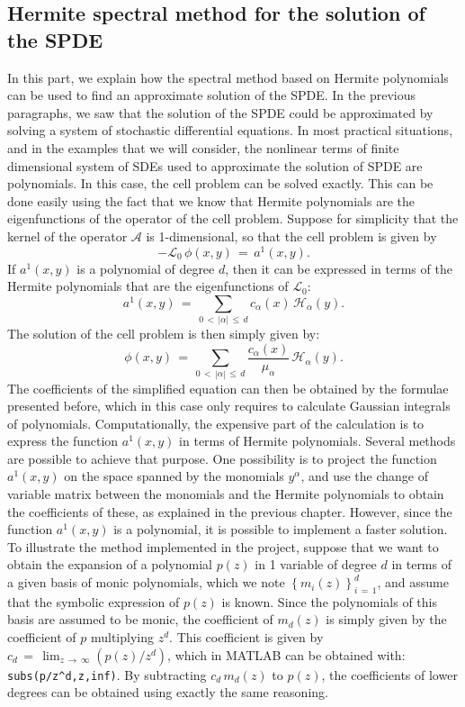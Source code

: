 \subsection{Hermite spectral method for the solution of the SPDE}
\label{sub:spectral_method_for_the_solution_of_the_spde}
In this part, we explain how the spectral method based on Hermite polynomials can be used to find an approximate solution of the SPDE. In the previous paragraphs, we saw that the solution of the SPDE could be approximated by solving a system of stochastic differential equations. In most practical situations, and in the examples that we will consider, the nonlinear terms of finite dimensional system of SDEs used to approximate the solution of SPDE are polynomials. In this case, the cell problem can be solved exactly. This can be done easily using the fact that we know that Hermite polynomials are the eigenfunctions of the operator of the cell problem. Suppose for simplicity that the kernel of the operator $\mathcal A$ is 1-dimensional, so that the cell problem is given by
\begin{equation*}
    -\mathcal L_0\,{\phi}(x,y) \,=\, a^1(x,y).
\end{equation*}
If $a^1(x,y)$ is a polynomial of degree $d$, then it can be expressed in terms of the Hermite polynomials that are the eigenfunctions of $\mathcal L_0$:  
\begin{equation*}
    a^1(x,y) \,=\, \sum_{0\,<\,|{\alpha}|\,{\leq}\,d} c_{\alpha} (x) \, \mathcal H_{\alpha}(y). 
\end{equation*}
The solution of the cell problem is then simply given by:
\begin{equation*}
    {\phi}(x,y) \,=\,\sum_{0 \,<\,|\mathcal {\alpha}| \,{\leq}\, d} \frac{c_{\alpha}(x)}{{\mu}_{\alpha}}\,   \mathcal H_{\alpha}(y). 
\end{equation*}
The coefficients of the simplified equation can then be obtained by the formulae presented before, which in this case only requires to calculate Gaussian integrals of polynomials. Computationally, the expensive part of the calculation is to express the function $a^1(x,y)$ in terms of Hermite polynomials. Several methods are possible to achieve that purpose. One possibility is to project the function $a^1(x,y)$ on the space spanned by the monomials $y^{\alpha}$, and use the change of variable matrix between the monomials and the Hermite polynomials to obtain the coefficients of these, as explained in the previous chapter. However, since the function $a^1(x,y)$ is a polynomial, it is possible to implement a faster solution. To illustrate the method implemented in the project, suppose that we want to obtain the expansion of a polynomial $p(z)$ in 1 variable of degree $d$ in terms of a given basis of monic polynomials, which we note $\left\{m_i(z)\right\}_{ i\,=\,1}^{ d}$, and assume that the symbolic expression of $p(z)$ is known. Since the polynomials of this basis are assumed to be monic, the coefficient of $m_d(z)$ is simply given by the coefficient of $p$ multiplying $z^d$. This coefficient is given by $c_d \,=\, \lim_{z\,\to\,{\infty}} (p(z)/z^d)$, which in MATLAB can be obtained with: \verb?subs(p/z^d,z,inf)?. By subtracting $c_d\,m_d(z)$ to $p(z)$, the coefficients of lower degrees can be obtained using exactly the same reasoning.

